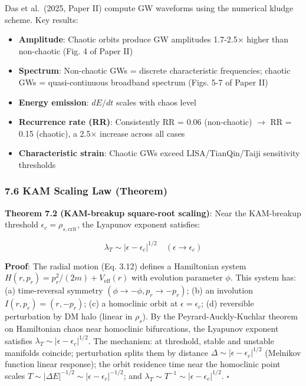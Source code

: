 \documentclass[
]{article}
\providecommand{\tightlist}{%
  \setlength{\itemsep}{0pt}\setlength{\parskip}{0pt}}
\begin{document}
Das et al.~(2025, Paper II) compute GW waveforms using the numerical
kludge scheme. Key results:

\begin{itemize}
\tightlist
\item
  \textbf{Amplitude}: Chaotic orbits produce GW amplitudes 1.7-2.5×
  higher than non-chaotic (Fig. 4 of Paper II)
\item
  \textbf{Spectrum}: Non-chaotic GWs = discrete characteristic
  frequencies; chaotic GWs = quasi-continuous broadband spectrum (Figs.
  5-7 of Paper II)
\item
  \textbf{Energy emission}: \(dE/dt\) scales with chaos level
\item
  \textbf{Recurrence rate (RR)}: Consistently RR = 0.06 (non-chaotic)
  \(\to\) RR = 0.15 (chaotic), a 2.5× increase across all cases
\item
  \textbf{Characteristic strain}: Chaotic GWs exceed LISA/TianQin/Taiji
  sensitivity thresholds
\end{itemize}

\subsubsection{7.6 KAM Scaling Law
(Theorem)}\label{kam-scaling-law-theorem}

\textbf{Theorem 7.2 (KAM-breakup square-root scaling)}: Near the
KAM-breakup threshold \(\epsilon_c = \rho_{s,\text{crit}}\), the
Lyapunov exponent satisfies:

\[\lambda_T \sim |\epsilon - \epsilon_c|^{1/2} \quad (\epsilon \to \epsilon_c)\]

\textbf{Proof}: The radial motion (Eq. 3.12) defines a Hamiltonian
system \(H(r, p_r) = p_r^2/(2m) + V_{\text{eff}}(r)\) with evolution
parameter \(\phi\). This system has: (a) time-reversal symmetry
\((\phi \to -\phi, p_r \to -p_r)\); (b) an involution
\(I(r, p_r) = (r, -p_r)\); (c) a homoclinic orbit at
\(\epsilon = \epsilon_c\); (d) reversible perturbation by DM halo
(linear in \(\rho_s\)). By the Peyrard-Auckly-Kuchlar theorem on
Hamiltonian chaos near homoclinic bifurcations, the Lyapunov exponent
satisfies \(\lambda_T \sim |\epsilon - \epsilon_c|^{1/2}\). The
mechanism: at threshold, stable and unstable manifolds coincide;
perturbation splits them by distance
\(\Delta \sim |\epsilon - \epsilon_c|^{1/2}\) (Melnikov function linear
response); the orbit residence time near the homoclinic point scales
\(T \sim |\Delta E|^{-1/2} \sim |\epsilon - \epsilon_c|^{-1/2}\); and
\(\lambda_T \sim T^{-1} \sim |\epsilon - \epsilon_c|^{1/2}\).
\(\square\)
\end{document}
